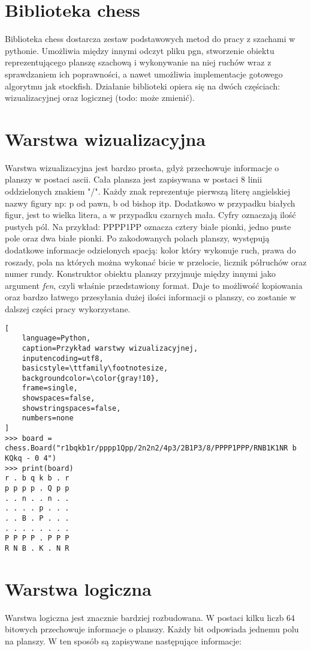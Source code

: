 \section*{Biblioteka chess}
Biblioteka chess dostarcza zestaw podstawowych metod do pracy z szachami w pythonie. Umożliwia między innymi odczyt pliku pgn, stworzenie obiektu reprezentującego planszę szachową i wykonywanie na niej ruchów wraz z sprawdzaniem ich poprawności, a nawet umożliwia implementacje gotowego algorytmu jak stockfish. Działanie biblioteki opiera się na dwóch częściach: wizualizacyjnej oraz logicznej (todo: może zmienić).

\section*{Warstwa wizualizacyjna}
Warstwa wizualizacyjna jest bardzo prosta, gdyż przechowuje informacje o planszy w postaci ascii. Cała plansza jest zapisywana w postaci 8 linii oddzielonych znakiem "/". Każdy znak reprezentuje pierwszą literę angielskiej nazwy figury np: p od pawn, b od bishop itp. Dodatkowo w przypadku białych figur, jest to wielka litera, a w przypadku czarnych mała. Cyfry oznaczają ilość pustych pól. Na przykład: PPPP1PP oznacza cztery białe pionki, jedno puste pole oraz dwa białe pionki. Po zakodowanych polach planszy, występują dodatkowe informacje odzielonych spacją: kolor który wykonuje ruch, prawa do roszady, pola na których można wykonać bicie w przelocie, licznik półruchów oraz numer rundy. Konstruktor obiektu planszy przyjmuje między innymi jako argument \textit{fen}, czyli właśnie przedstawiony format. Daje to możliwość kopiowania oraz bardzo łatwego przesyłania dużej ilości informacji o planszy, co zostanie w dalszej części pracy wykorzystane.

\begin{lstlisting}[
    language=Python,
    caption=Przykład warstwy wizualizacyjnej,
    inputencoding=utf8,
    basicstyle=\ttfamily\footnotesize,
    backgroundcolor=\color{gray!10},
    frame=single,
    showspaces=false,
    showstringspaces=false,
    numbers=none
]
>>> board = chess.Board("r1bqkb1r/pppp1Qpp/2n2n2/4p3/2B1P3/8/PPPP1PPP/RNB1K1NR b KQkq - 0 4")
>>> print(board)
r . b q k b . r
p p p p . Q p p
. . n . . n . .
. . . . p . . .
. . B . P . . .
. . . . . . . .
P P P P . P P P
R N B . K . N R
\end{lstlisting}

\section*{Warstwa logiczna}
Warstwa logiczna jest znacznie bardziej rozbudowana. W postaci kilku liczb 64 bitowych przechowuje informacje o planszy. Każdy bit odpowiada jednemu polu na planszy. W ten sposób są zapisywane następujące informacje:


